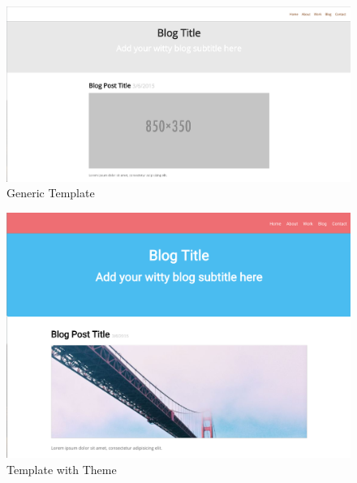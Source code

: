 \begin{figure}[h]
\centering
\includegraphics[scale=0.13]{images/placeholderTemp}
\caption{Generic Template}
  \label{fig:gentemp}
\end{figure}


\begin{figure}[ht]
\centering
\includegraphics[scale=0.2]{images/withtheme}
\caption{Template with Theme}
  \label{fig:temtheme}
\end{figure}

